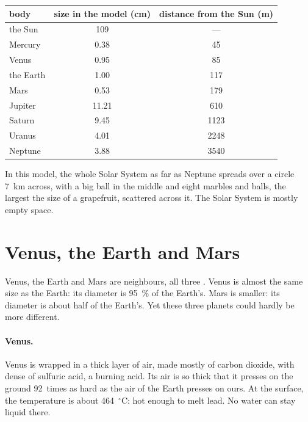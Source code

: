 \begin{center}\small
\begin{tabular}{|l|c|c|}
\hline
\textbf{body} & \textbf{size in the model (cm)} & \textbf{distance from the Sun (m)} \\
\hline
the Sun & 109 & --- \\
Mercury & 0.38 & 45 \\
Venus & 0.95 & 85 \\
the Earth & 1.00 & 117 \\
Mars & 0.53 & 179 \\
Jupiter & 11.21 & 610 \\
Saturn & 9.45 & 1123 \\
Uranus & 4.01 & 2248 \\
Neptune & 3.88 & 3540 \\
\hline
\end{tabular}
\end{center}

In this model, the whole Solar System as far as Neptune spreads over a
circle 7~km across, with a big ball in the middle and eight marbles and
balls, the largest the size of a grapefruit, scattered across it. The
Solar System is mostly empty space.

\section{Venus, the Earth and Mars}

Venus, the Earth and Mars are neighbours, all three . Venus is
almost the same size as the Earth: its diameter is 95~\% of the Earth's.
Mars is smaller: its diameter is about half of the Earth's. Yet these three
planets could hardly be more different.

\paragraph{Venus.} Venus is wrapped in a thick layer of air, made mostly of
carbon dioxide, with dense  of sulfuric acid, a burning acid. Its
air is so thick that it presses on the ground 92~times as hard as the air
of the Earth presses on ours. At the surface, the temperature is about
464~$^\circ$C: hot enough to melt lead. No water can stay
liquid there.

